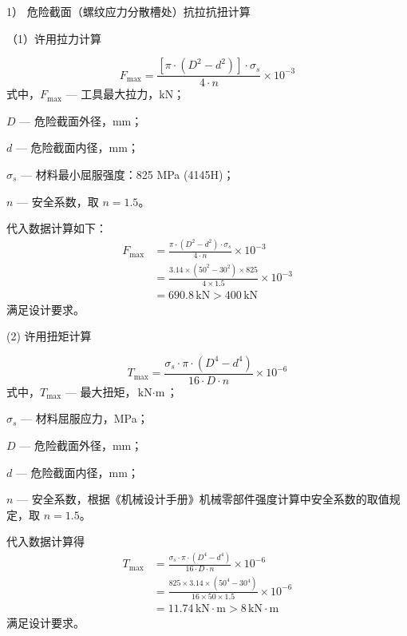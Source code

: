 1） 危险截面（螺纹应力分散槽处）抗拉抗扭计算

（1）许用拉力计算

\begin{equation}
    F_{\max} = \frac{[\pi \cdot (D^2 - d^2)] \cdot \sigma_s}{4 \cdot n} \times 10^{-3}
\end{equation}
式中，$F_{\max}$ — 工具最大拉力，kN；

$D$ — 危险截面外径，mm；

$d$ — 危险截面内径，mm；

$\sigma_s$ — 材料最小屈服强度：825 MPa (4145H)；

$n$ — 安全系数，取 $n = 1.5$。

代入数据计算如下：
\begin{equation}
\begin{aligned}
    F_{\max} &= \frac{\pi \cdot (D^2 - d^2) \cdot \sigma_s}{4 \cdot n} \times 10^{-3} \\
             &= \frac{3.14 \times (50^2 - 30^2) \times 825}{4 \times 1.5} \times 10^{-3} \\
             &= 690.8 \, \text{kN} > 400 \, \text{kN}      
\end{aligned}
\end{equation}
满足设计要求。

(2) 许用扭矩计算

\begin{equation}
    T_{\max} = \frac{\sigma_s \cdot \pi \cdot (D^4 - d^4)}{16 \cdot D \cdot n} \times 10^{-6}
\end{equation}
式中，$T_{\max}$ — 最大扭矩，$\text{kN} \cdot \text{m}$；

$\sigma_s$ — 材料屈服应力，MPa；

$D$ — 危险截面外径，mm；

$d$ — 危险截面内径，mm；

$n$ — 安全系数，根据《机械设计手册》机械零部件强度计算中安全系数的取值规定\cite{ref26}，取 $n = 1.5$。

代入数据计算得
\begin{equation}
\begin{aligned}
    T_{\max} &= \frac{\sigma_s \cdot \pi \cdot (D^4 - d^4)}{16 \cdot D \cdot n} \times 10^{-6} \\
             &= \frac{825 \times 3.14 \times (50^4 - 30^4)}{16 \times 50 \times 1.5} \times 10^{-6} \\
             &= 11.74 \, \text{kN} \cdot \text{m} > 8 \, \text{kN} \cdot \text{m}
\end{aligned}
\end{equation}
满足设计要求。

